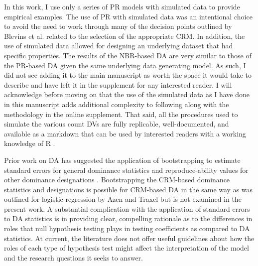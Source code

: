 \documentclass[doc]{apa7}
\begin{document}
	In this work, I use only a series of PR models with simulated data to provide empirical examples.
	The use of PR with simulated data was an intentional choice to avoid the need to work through many of the decision points outlined by Blevins et al. \parencite*{blevins2015count} related to the selection of the appropriate CRM.
	In addition, the use of simulated data allowed for designing an underlying dataset that had specific properties.
	The results of the NBR-based DA are very similar to those of the PR-based DA given the same underlying data generating model.
	As such, I did not see adding it to the main manuscript as worth the space it would take to describe and have left it in the supplement for any interested reader.
	I will acknowledge before moving on that the use of the simulated data as I have done in this manuscript adds additional complexity to following along with the methodology in the online supplement.
	That said, all the procedures used to simulate the various count DVs are fully replicable, well-documented, and available as a markdown that can be used by interested readers with a working knowledge of R \parencite{R}.
	
	Prior work on DA has suggested the application of bootstrapping to estimate standard errors for general dominance statistics and reproduce-ability values for other dominance designations \parencite{azen2009using,braun2019accuracy}. 
	Bootstrapping the CRM-based dominance statistics and designations is possible for CRM-based DA in the same way as was outlined for logistic regression by Azen and Traxel \parencite*{azen2009using} but is not examined in the present work.
	A substantial complication with the application of standard errors to DA statistics is in providing clear, compelling rationale as to the differences in roles that null hypothesis testing plays in testing coefficients as compared to DA statistics.
	At current, the literature does not offer useful guidelines about how the roles of each type of hypothesis test might affect the interpretation of the model and the research questions it seeks to answer.
	
\end{document}
